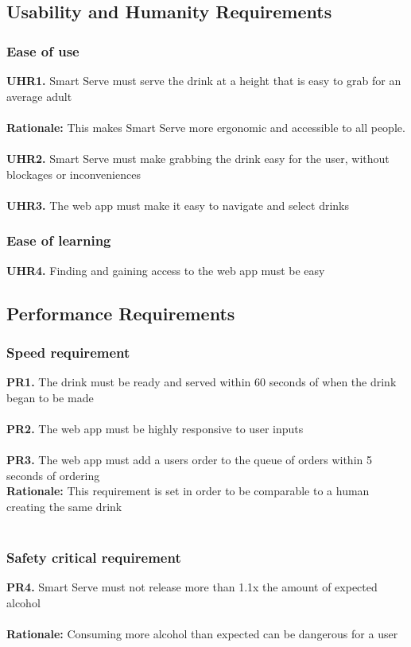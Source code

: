 \documentclass{article}
\begin{document}
\subsection{Usability and Humanity Requirements}
    \subsubsection{Ease of use}
        \noindent\textbf{UHR1.} Smart Serve must serve the drink at a height that is easy to grab for an average adult \\\\
        \textbf{Rationale:} This makes Smart Serve more ergonomic and accessible to all people.\\\\
        \textbf{UHR2.} Smart Serve must make grabbing the drink easy for the user, without blockages or inconveniences\\\\
        \textbf{UHR3.} The web app must make it easy to navigate and select drinks\\
    \subsubsection{Ease of learning}
        \noindent\textbf{UHR4.} Finding and gaining access to the web app must be easy \\

\subsection{Performance Requirements}
    \subsubsection{Speed requirement}
        \noindent\textbf{PR1.} The drink must be ready and served within 60 seconds of when the drink began to be made \\\\
        \textbf{PR2.} The web app must be highly responsive to user inputs \\\\
        \textbf{PR3.} The web app must add a users order to the queue of orders within 5 seconds of ordering \\
        \indent\textbf{Rationale:} This requirement is set in order to be comparable to a human creating the same drink\\\
    \subsubsection{Safety critical requirement}
        \noindent\textbf{PR4.} Smart Serve must not release more than 1.1x the amount of expected alcohol \\
        \\ \indent\textbf{Rationale:} Consuming more alcohol than expected can be dangerous for a user \\
\end{document}
